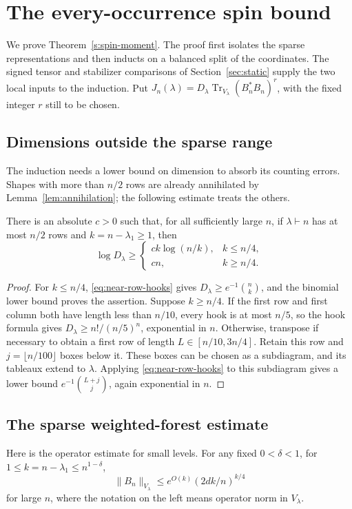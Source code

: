 \section{The every-occurrence spin bound}\label{ten:spin}
We prove Theorem~\ref{s:spin-moment}. The proof first isolates the sparse representations and then inducts on a balanced split of the coordinates. The signed tensor and stabilizer comparisons of Section~\ref{sec:static} supply the two local inputs to the induction. Put $J_n(\lambda)=D_\lambda\operatorname{Tr}_{V_\lambda}(B_n^*B_n)^r$, with the fixed integer $r$ still to be chosen.

\subsection{Dimensions outside the sparse range}
The induction needs a lower bound on dimension to absorb its counting
errors. Shapes with more than $n/2$ rows are already annihilated by
Lemma~\ref{lem:annihilation}; the following estimate treats the others.

\begin{lemma}\label{lem:spin-dimension-range}
There is an absolute $c>0$ such that, for all sufficiently large $n$,
if $\lambda\vdash n$ has at most $n/2$ rows and $k=n-\lambda_1\ge1$, then
\[
 \log D_\lambda\ge
 \begin{cases}
 c k\log(n/k),&k\le n/4,\\
 c n,&k\ge n/4.
 \end{cases}
\]
\end{lemma}
\begin{proof}
For $k\le n/4$, \eqref{eq:near-row-hooks} gives
$D_\lambda\ge e^{-1}\binom nk$, and the binomial lower bound proves
the assertion. Suppose $k\ge n/4$. If the first row and first column
both have length less than $n/10$, every hook is at most $n/5$, so the
hook formula gives $D_\lambda\ge n!/(n/5)^n$, exponential in $n$.
Otherwise, transpose if necessary to obtain a first row of length
$L\in[n/10,3n/4]$. Retain this row and $j=\lfloor n/100\rfloor$
boxes below it. These boxes can be chosen as a subdiagram, and its
tableaux extend to $\lambda$. Applying \eqref{eq:near-row-hooks} to
this subdiagram gives a lower bound
$e^{-1}\binom{L+j}{j}$, again exponential in $n$.
\end{proof}

\subsection{The sparse weighted-forest estimate}
Here is the operator estimate for small levels. For any fixed \(0<\delta<1\), for \(1\le k=n-\lambda_1\le n^{1-\delta}\),
\begin{equation}
 \|B_n\|_{V_\lambda}\le e^{O(k)} (2dk/n)^{k/4}
 \label{ten:spin:eq:5}
\end{equation}
for large \(n\), where the notation on the left means operator norm in \(V_\lambda\).

